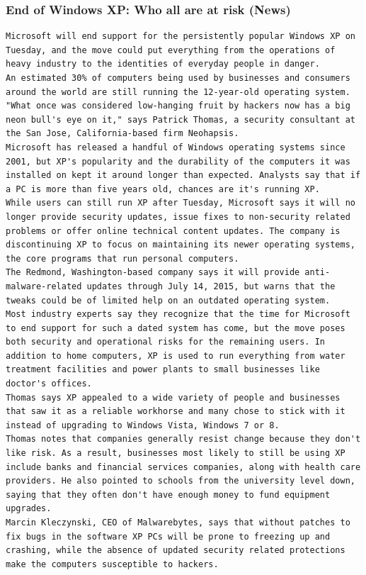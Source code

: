 \documentclass[BTech]{nitgoathesis}
\begin{document}
\subsubsection{End of Windows XP: Who all are at risk (News)}
\begin{lstlisting}[basicstyle=\scriptsize]
Microsoft will end support for the persistently popular Windows XP on Tuesday, and the move could put everything from the operations of heavy industry to the identities of everyday people in danger.
An estimated 30% of computers being used by businesses and consumers around the world are still running the 12-year-old operating system.
"What once was considered low-hanging fruit by hackers now has a big neon bull's eye on it," says Patrick Thomas, a security consultant at the San Jose, California-based firm Neohapsis.
Microsoft has released a handful of Windows operating systems since 2001, but XP's popularity and the durability of the computers it was installed on kept it around longer than expected. Analysts say that if a PC is more than five years old, chances are it's running XP.
While users can still run XP after Tuesday, Microsoft says it will no longer provide security updates, issue fixes to non-security related problems or offer online technical content updates. The company is discontinuing XP to focus on maintaining its newer operating systems, the core programs that run personal computers.
The Redmond, Washington-based company says it will provide anti-malware-related updates through July 14, 2015, but warns that the tweaks could be of limited help on an outdated operating system.
Most industry experts say they recognize that the time for Microsoft to end support for such a dated system has come, but the move poses both security and operational risks for the remaining users. In addition to home computers, XP is used to run everything from water treatment facilities and power plants to small businesses like doctor's offices.
Thomas says XP appealed to a wide variety of people and businesses that saw it as a reliable workhorse and many chose to stick with it instead of upgrading to Windows Vista, Windows 7 or 8.
Thomas notes that companies generally resist change because they don't like risk. As a result, businesses most likely to still be using XP include banks and financial services companies, along with health care providers. He also pointed to schools from the university level down, saying that they often don't have enough money to fund equipment upgrades.
Marcin Kleczynski, CEO of Malwarebytes, says that without patches to fix bugs in the software XP PCs will be prone to freezing up and crashing, while the absence of updated security related protections make the computers susceptible to hackers.

\end{lstlisting}
\end{document}
